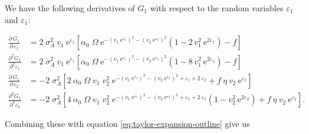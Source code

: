 We have the following derivatives of $G_1$ with respect to the random variables $\varepsilon_1$ and $\varepsilon_1$:

\begin{equation*}
\begin{split}
    \frac{\partial \, G_1}{\partial \, \varepsilon_1} &= 2 \; \sigma_A^2 \: v_{1} \: \text{e}^{\varepsilon_1}
    \left[
        \alpha_0 \; \Omega \;
            \text{e}^{-(v_{1} \: \text{e}^{\varepsilon_1})^2 - (v_{2} \: \text{e}^{\varepsilon_2})^2}
            \left(
                1 - 2 \, v_{1}^2 \: \text{e}^{2 \varepsilon_1}
            \right)
        - f
    \right] \\
% 
    \frac{\partial^2 G_1}{\partial^2 \varepsilon_1} &= 2 \; \sigma_A^2 \: v_{1} \: \text{e}^{\varepsilon_1}
    \left[
        \alpha_0 \; \Omega \;
            \text{e}^{-(v_{1} \: \text{e}^{\varepsilon_1})^2 - (v_{2} \: \text{e}^{\varepsilon_2})^2}
            \left(
                1 - 8 \, v_{1}^2 \: \text{e}^{2 \varepsilon_1}
            \right)
        - f
    \right] \\[2ex]
%
%
    \frac{\partial \, G_1}{\partial \, \varepsilon_2} &= - 2 \; \sigma_A^2
    \left[
        2 \: \alpha_0 \; \Omega \; v_1 \; v_2^2 \;
            \text{e}^{-(v_{1} \: \text{e}^{\varepsilon_1})^2 - (v_{2} \: \text{e}^{\varepsilon_2})^2 + \varepsilon_1 + 2 \, \varepsilon_2}
        + f \: \eta \: v_2 \: \text{e}^{\varepsilon_2}
    \right] \\
% 
    \frac{\partial^2 G_1}{\partial^2 \varepsilon_2} &= - 2 \; \sigma_A^2
    \left[
        4 \: \alpha_0 \; \Omega \; v_1 \; v_2^2 \;
            \text{e}^{-(v_{1} \: \text{e}^{\varepsilon_1})^2 - (v_{2} \: \text{e}^{\varepsilon_2})^2 + \varepsilon_1 + 2 \, \varepsilon_2}
            \left(
                1 - v_{2}^2 \: \text{e}^{2 \varepsilon_2}
            \right)
        + f \: \eta \: v_2 \: \text{e}^{\varepsilon_2}
    \right]
\text{.}
\end{split}
\end{equation*}


Combining these with equation \ref{eq:taylor-expansion-outline} give us 

